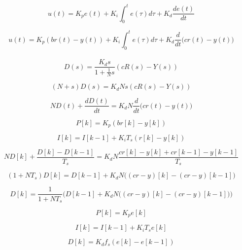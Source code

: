 \documentclass{article}
\begin{document}
\begin{equation}
    u(t) = K_p e(t) + K_i \int_0^t{e(\tau)d\tau} +  K_d \frac{de(t)}{dt}
    \tag{1a}
\end{equation}

\begin{equation}
    u(t) = K_p \left( b r(t) - y(t) \right) + K_i \int_0^t{e(\tau) d\tau} + K_d \frac{d}{dt}\Big( c r(t) - y(t) \Big)
    \tag{1b}
\end{equation}
\\[2cm]
\begin{equation}
    D(s) = \frac{K_ds}{1+\frac{1}{N}s} (cR(s)-Y(s))
    \tag{2a}
\end{equation}

\begin{equation}
    \left(N + s\right)D(s) = K_dNs(cR(s)-Y(s))
    \tag{2b}
\end{equation}

\begin{equation}
    ND(t) + \frac{dD(t)}{dt} = K_dN\frac{d}{dt}\Big( c r(t) - y(t) \Big)
    \tag{2c}
\end{equation}

\begin{equation}
    P[k] = K_p(br[k]-y[k])
    \tag{3a}
\end{equation}

\begin{equation}
    I[k] = I[k-1] + K_iT_s(r[k]-y[k])
    \tag{3b}
\end{equation}

\begin{equation}
    ND[k]+\frac{D[k]-D[k-1]}{T_s} = K_dN\frac{cr[k]-y[k] + cr[k-1] - y[k-1]}{T_s}
    \tag{4a}
\end{equation}

\begin{equation}
    (1 + NT_s)D[k] = D[k-1] + K_dN\bigg((cr - y)[k] - (cr - y)[k-1]\bigg)
    \tag{4b}
\end{equation}

\begin{equation}
    D[k] = \frac{1}{1+NT_s}\bigg(D[k-1] + K_dN\big((cr - y)[k] - (cr - y)[k-1]\big)\bigg)
    \tag{4c}
\end{equation}


\begin{equation}
    P[k] = K_p e[k]
    \tag{5a}
\end{equation}

\begin{equation}
    I[k] = I[k-1] + K_i T_s e[k]
    \tag{5b}
\end{equation}

\begin{equation}
    D[k] = K_d f_s (e[k] - e[k-1])
    \tag{5c}
\end{equation}
\end{document}

